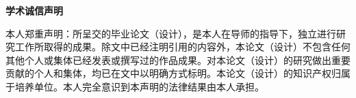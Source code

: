 \heiti\selectfont
\centering \textbf{学术诚信声明}
\songti\selectfont


本人郑重声明：所呈交的毕业论文（设计），是本人在导师的指导下，独立进行研究工作所取得的成果。除文中已经注明引用的内容外，本论文（设计）不包含任何其他个人或集体已经发表或撰写过的作品成果。对本论文（设计）的研究做出重要贡献的个人和集体，均已在文中以明确方式标明。本论文（设计）的知识产权归属于培养单位。本人完全意识到本声明的法律结果由本人承担。

\vspace{2\baselineskip}

\begin{flushright}
	 \makebox[5cm]{\hspace{1cm}} \\
	\vspace{2\baselineskip}
	  \\
\end{flushright}






\endinput
